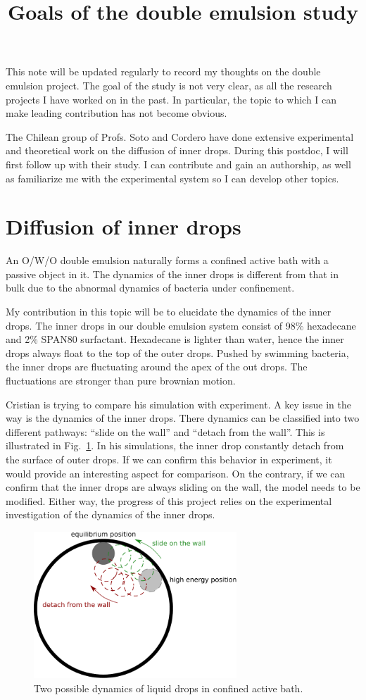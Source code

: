 \documentclass[onecolumn,aps, pre,amsmath,amssymb,longbibliography,12pt]{revtex4-2}
\begin{document}
\title{Goals of the double emulsion study}
\maketitle

This note will be updated regularly to record my thoughts on the double emulsion project.
The goal of the study is not very clear, as all the research projects I have worked on in the past.
In particular, the topic to which I can make leading contribution has not become obvious.

The Chilean group of Profs. Soto and Cordero have done extensive experimental and theoretical work on the diffusion of inner drops.
During this postdoc, I will first follow up with their study.
I can contribute and gain an authorship, as well as familiarize me with the experimental system so I can develop other topics.

\section{Diffusion of inner drops}

An O/W/O double emulsion naturally forms a confined active bath with a passive object in it.
The dynamics of the inner drops is different from that in bulk due to the abnormal dynamics of bacteria under confinement.

My contribution in this topic will be to elucidate the dynamics of the inner drops.
The inner drops in our double emulsion system consist of 98\% hexadecane and 2\% SPAN80 surfactant.
Hexadecane is lighter than water, hence the inner drops always float to the top of the outer drops.
Pushed by swimming bacteria, the inner drops are fluctuating around the apex of the out drops.
The fluctuations are stronger than pure brownian motion.

Cristian is trying to compare his simulation with experiment.
A key issue in the way is the dynamics of the inner drops.
There dynamics can be classified into two different pathways: ``slide on the wall'' and ``detach from the wall''.
This is illustrated in Fig.~\ref{fig:pathways}.
In his simulations, the inner drop constantly detach from the surface of outer drops.
If we can confirm this behavior in experiment, it would provide an interesting aspect for comparison.
On the contrary, if we can confirm that the inner drops are always sliding on the wall, the model needs to be modified.
Either way, the progress of this project relies on the experimental investigation of the dynamics of the inner drops.

\begin{center}
  \begin{figure}
    \includegraphics[width=3in]{pathways.pdf}
    \caption{Two possible dynamics of liquid drops in confined active bath.}
    \label{fig:pathways}
  \end{figure}
\end{center}
\end{document}
